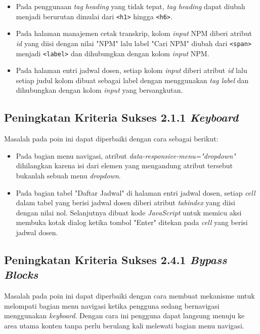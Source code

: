 \begin{itemize}
    \item Pada penggunaan \textit{tag heading} yang tidak tepat, \textit{tag heading} dapat diubah menjadi berurutan dimulai dari \texttt{<h1>} hingga \texttt{<h6>}.
    \item Pada halaman manajemen cetak transkrip, kolom \textit{input} NPM diberi atribut \textit{id} yang diisi dengan nilai "NPM" lalu label "Cari NPM" diubah dari \texttt{<span>} menjadi \texttt{<label>} dan dihubungkan dengan kolom \textit{input} NPM.
    \item Pada halaman entri jadwal dosen, setiap kolom \textit{input} diberi atribut \textit{id} lalu setiap judul kolom dibuat sebagai label dengan menggunakan \textit{tag label} dan dihubungkan dengan kolom \textit{input} yang bersangkutan.
\end{itemize}

\subsection{Peningkatan Kriteria Sukses 2.1.1 \textit{Keyboard}}
\label{subsec:peningkatan_kriteria_sukses_2.1.1}
Masalah pada poin ini dapat diperbaiki dengan cara sebagai berikut:

\begin{itemize}
    \item Pada bagian menu navigasi, atribut \textit{data-responsive-menu="dropdown"} dihilangkan karena isi dari elemen yang mengandung atribut tersebut bukanlah sebuah menu \textit{dropdown}.
    \item Pada bagian tabel "Daftar Jadwal" di halaman entri jadwal dosen, setiap \textit{cell} dalam tabel yang berisi jadwal dosen diberi atribut \textit{tabindex} yang diisi dengan nilai nol. Selanjutnya dibuat kode \textit{JavaScript} untuk memicu aksi membuka kotak dialog ketika tombol "Enter" ditekan pada \textit{cell} yang berisi jadwal dosen.
\end{itemize}

\subsection{Peningkatan Kriteria Sukses 2.4.1 \textit{Bypass Blocks}}
\label{subsec:peningkatan_kriteria_sukses_2.4.1}
Masalah pada poin ini dapat diperbaiki dengan cara membuat mekanisme untuk melompati bagian menu navigasi ketika pengguna sedang bernavigasi menggunakan \textit{keyboard}. Dengan cara ini pengguna dapat langsung menuju ke area utama konten tanpa perlu berulang kali melewati bagian menu navigasi.

